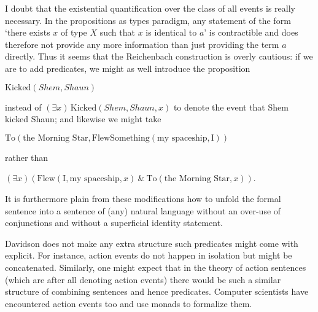 \documentclass{article}
\begin{document}
I doubt that the existential quantification over the class of all events is 
really necessary. In the propositions as types paradigm, any statement of the 
form `there exists $x$ of type $X$ such that $x$ is identical to $a$' is
contractible and does therefore not provide any more information than just 
providing the term $a$ directly. Thus it seems that the Reichenbach construction
is overly cautious: if we are to add predicates, we might as well introduce the
proposition
\begin{center}
$\text{Kicked}(Shem,Shaun)$
\end{center}
instead of $(\exists x)\,\text{Kicked}(Shem,Shaun,x)$ to denote the event that
Shem kicked Shaun; and likewise we might take
\begin{center}
$\text{To}(\text{the Morning Star},
\text{FlewSomething}(\text{my spaceship},\text{I}))$
\end{center}
rather than
\begin{center}
$(\exists x) (\text{Flew}(\text{I},\text{my spaceship},x)\ \&\ \text{To}(\text{the
Morning Star},x))$.
\end{center}
It is furthermore plain from these modifications how to unfold the formal
sentence into a sentence of (any) natural language without an over-use of
conjunctions and without a superficial identity statement.

Davidson does not make any extra structure such predicates might come with 
explicit. For instance, action events do not happen in isolation but might be 
concatenated. Similarly,
one might expect that in the theory of action sentences (which are after all
denoting action events) there would be such a similar structure of combining
sentences and hence predicates. Computer scientists have encountered action 
events too and use monads to formalize them. 
\end{document}
